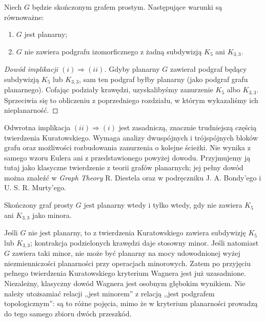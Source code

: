 \begin{twierdzenie}[Kuratowski]
\label{thm:tg-kuratowski}
Niech $G$ będzie skończonym grafem prostym. Następujące
warunki są równoważne:
\begin{enumerate}[label=(\roman*)]
\item $G$ jest planarny;
\item $G$ nie zawiera podgrafu izomorficznego z żadną
subdywizją $K_5$ ani $K_{3,3}$.
\end{enumerate}
\end{twierdzenie}

\begin{proof}[Dowód implikacji \texorpdfstring{$(i)\Rightarrow(ii)$}{(i) => (ii)}]
Gdyby planarny $G$ zawierał podgraf będący subdywizją
$K_5$ lub $K_{3,3}$, sam ten podgraf byłby planarny
(jako podgraf grafu planarnego). Cofając podziały krawędzi,
uzyskalibyśmy zanurzenie $K_5$ albo $K_{3,3}$.
Sprzeciwia się to obliczeniu z poprzedniego rozdziału,
w którym wykazaliśmy ich nieplanarność.
\end{proof}

\begin{uwaga}
Odwrotna implikacja $(ii)\Rightarrow(i)$ jest zasadniczą,
znacznie trudniejszą częścią twierdzenia Kuratowskiego.
Wymaga analizy dwuspójnych i trójspójnych bloków grafu
oraz możliwości rozbudowania zanurzenia o kolejne ścieżki.
Nie wynika z samego wzoru Eulera ani z przedstawionego
powyżej dowodu. Przyjmujemy ją tutaj jako klasyczne
twierdzenie z teorii grafów planarnych; jej pełny dowód
można znaleźć w \emph{Graph Theory} R. Diestela oraz
w podręczniku J. A. Bondy'ego i U. S. R. Murty'ego.
\end{uwaga}

\begin{twierdzenie}
\label{thm:tg-wagner}
Skończony graf prosty $G$ jest planarny wtedy i tylko wtedy,
gdy nie zawiera $K_5$ ani $K_{3,3}$ jako minora.
\end{twierdzenie}

\begin{uwaga}
Jeśli $G$ nie jest planarny, to z twierdzenia Kuratowskiego
zawiera subdywizję $K_5$ lub $K_{3,3}$; kontrakcja
podzielonych krawędzi daje stosowny minor.
Jeśli natomiast $G$ zawiera taki minor, nie może być
planarny na mocy udowodnionej wyżej niezmienniczości
planarności przy operacjach minorowych.
Zatem po przyjęciu pełnego twierdzenia Kuratowskiego
kryterium Wagnera jest już uzasadnione. Niezależny,
klasyczny dowód Wagnera jest osobnym głębokim wynikiem. Nie należy utożsamiać relacji
,,jest minorem'' z relacją ,,jest podgrafem topologicznym'':
są to różne pojęcia, mimo że w kryterium planarności
prowadzą do tego samego zbioru dwóch przeszkód.
\end{uwaga}

